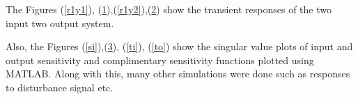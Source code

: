 \documentclass[a4paper,12pt]{article}
\begin{document}
			The Figures (\ref{r1y1}), (\ref{r2y1}),(\ref{r1y2}),(\ref{r2y2}) show the transient responses of the two input two output system. 
					\begin{figure}[H]
\centering
\begin{minipage}{0.6\textwidth}
  \centering
%  
 \def\svgscale{0.5}
			  \tiny{
			  }
  \label{r1y1}
\end{minipage}%
\begin{minipage}{0.6\textwidth}
  \centering
%  
 \def\svgscale{0.5}
			  \tiny{
			  }
  \label{r2y1}
\end{minipage}
\end{figure}
					\begin{figure}[H]
\centering
\begin{minipage}{0.6\textwidth}
  \centering
%  
 \def\svgscale{0.5}
			  \tiny{
			  }
  \label{r1y2}
\end{minipage}%
\begin{minipage}{0.6\textwidth}
  \centering
%  
 \def\svgscale{0.5}
			  \tiny{
			  }
  \label{r2y2}
\end{minipage}
\end{figure}
			Also, the Figures (\ref{si}),(\ref{so}), (\ref{ti}), (\ref{to}) show the singular value plots of input and output sensitivity and complimentary sensitivity functions plotted using MATLAB. Along with this, many other simulations were done such as responses to disturbance signal etc.
								\begin{figure}[H]
\centering
\begin{minipage}{0.6\textwidth}
  \centering
%  
 \def\svgscale{0.5}
			  \tiny{
			  }
  \label{si}
\end{minipage}%
\begin{minipage}{0.6\textwidth}
  \centering
%  
 \def\svgscale{0.5}
			  \tiny{
			  }
  \label{so}
\end{minipage}
\end{figure}
\end{document}
